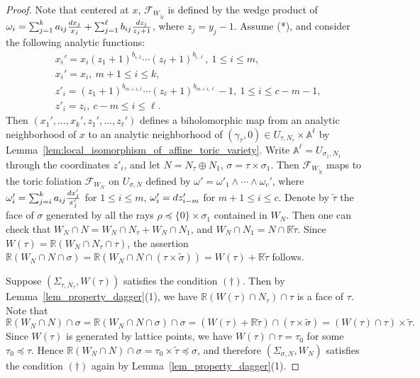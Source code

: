 \documentclass[10pt,a4paper]{amsart}
\newcommand\bA{{\mathbb A}}
\newcommand\bR{{\mathbb R}}
\newcommand\cF{{\mathcal{F}}}
\newcommand{\diff}{\textnormal{d}}
\begin{document}
\begin{proof}
    Note that centered at $x$, $\cF_{W_{\widetilde N}}$ is defined by the wedge product of $\omega_i=\sum_{j=1}^ka_{ij}\frac{\diff x_j}{x_j}+\sum_{j=1}^{\ell}b_{ij}\frac{\diff z_{j}}{z_{j}+1}$, where $z_j=y_j-1$. Assume (*), and consider the following analytic functions:
    \begin{align*}
    &x_i'=x_i(z_1+1)^{b_{i,1}}\cdots(z_\ell+1)^{b_{i,\ell}},\ 1\leq i\leq m,\\
    &x_{i}'=x_{i},\ m+1\leq i\leq k,\\
    &z'_i=(z_1+1)^{b_{m+i,1}}\cdots (z_\ell+1)^{b_{m+i,\ell}}-1,\ 1\leq i\leq c-m-1,\\
    &z'_{i}=z_{i},\ c-m\leq i\leq \ell.
    \end{align*}
    Then $(x_1',\ldots,x_k',z_1',\ldots,z_\ell')$ defines a biholomorphic map from an analytic neighborhood of $x$ to an analytic neighborhood of $(\gamma_{\tau},0)\in U_{\tau,N_\tau}\times\bA^\ell$ by Lemma~\ref{lem:local_isomorphism_of_affine_toric_variety}. Write $\bA^\ell=U_{\sigma_1,N_1}$ through the coordinates $z'_i$, and let $N=N_\tau\oplus N_1$, $\sigma=\tau\times\sigma_1$. Then $\cF_{W_{\widetilde N}}$ maps to the toric foliation $\cF_{W_N}$ on $U_{\sigma,N}$ defined by $\omega'=\omega'_1\wedge\cdots\wedge\omega_c'$, where $\omega'_i=\sum_{j=i}^ka_{ij}\frac{\diff x_j'}{x_j'}$ for $1\leq i\leq m$, $\omega'_i=\diff z'_{i-m}$ for $m+1\leq i\leq c$. Denote by $\widetilde\tau$ the face of $\sigma$ generated by all the rays $\rho\preceq\{0\}\times\sigma_1$ contained in $W_N$.
    Then one can check that $W_N\cap N=W_N\cap N_\tau+W_N\cap N_1$, and $W_N\cap N_1=N\cap\bR\widetilde\tau$. Since $W(\tau) = \bR(W_N\cap N_\tau \cap \tau)$, the assertion $\bR(W_{N}\cap N\cap\sigma)=\bR(W_{N}\cap N\cap(\tau\times\widetilde\sigma))=W(\tau)+\bR\widetilde\tau$ follows.

    Suppose $(\Sigma_{\tau,N_\tau},W(\tau))$ satisfies the condition $(\dagger)$. 
    Then by Lemma~\ref{lem_property_dagger}(1), we have $\bR(W(\tau)\cap N_\tau) \cap \tau$ is a face of $\tau$. 
    Note that 
    \[\bR(W_N\cap N)\cap\sigma=\bR(W_N\cap N\cap\sigma)\cap\sigma=(W(\tau)+\bR\widetilde\tau)\cap(\tau\times\widetilde\sigma)=(W(\tau)\cap\tau)\times \widetilde\tau.\]
    Since $W(\tau)$ is generated by lattice points, we have $W(\tau)\cap \tau=\tau_0$ for some $\tau_0\preceq\tau$. Hence $\bR(W_N\cap N)\cap\sigma=\tau_0\times\widetilde\tau\preceq\sigma$,
    and therefore $(\Sigma_{\sigma,N},W_N)$ satisfies the condition $(\dagger)$ again by Lemma~\ref{lem_property_dagger}(1).


\end{proof}
\end{document}
